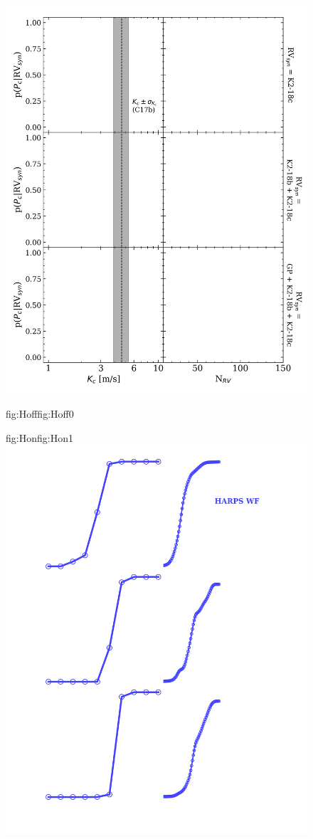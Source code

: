 \begin{figure}
  \centering
  \includegraphics[width=0.8\hsize]{figures/9vKcNrv_bkgd.png}%
  \hspace{-0.8\hsize}%
  \begin{ocg}{fig:Hoff}{fig:Hoff}{0}%
  \end{ocg}%
  \begin{ocg}{fig:Hon}{fig:Hon}{1}%
  \includegraphics[width=0.8\hsize]{figures/9vKcNrv_harps.png}%

\end{ocg}
\end{figure}
